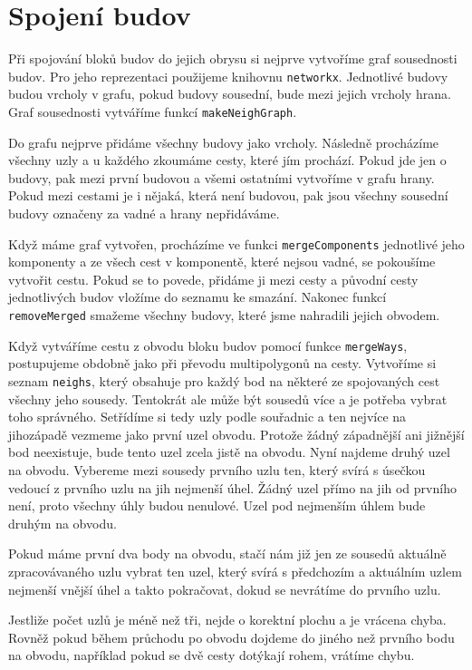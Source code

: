 \section{Spojení budov}
Při spojování bloků budov do jejich obrysu si nejprve vytvoříme graf sousednosti
budov. Pro jeho reprezentaci použijeme knihovnu \verb|networkx|. Jednotlivé
budovy budou vrcholy v grafu, pokud budovy sousední, bude mezi jejich vrcholy
hrana. Graf sousednosti vytváříme funkcí \verb|makeNeighGraph|.

Do grafu nejprve přidáme všechny budovy jako vrcholy. Následně procházíme
všechny uzly a u každého zkoumáme cesty, které jím prochází. Pokud jde jen o
budovy, pak mezi první budovou a všemi ostatními vytvoříme v grafu hrany. Pokud
mezi cestami je i nějaká, která není budovou, pak jsou všechny sousední budovy
označeny za vadné a hrany nepřidáváme.

Když máme graf vytvořen, procházíme ve funkci \verb|mergeComponents| jednotlivé
jeho komponenty a ze všech cest v komponentě, které nejsou vadné, se pokoušíme
vytvořit cestu. Pokud se to povede, přidáme ji mezi cesty a původní cesty
jednotlivých budov vložíme do seznamu ke smazání. Nakonec funkcí
\verb|removeMerged| smažeme všechny budovy, které jsme nahradili jejich obvodem.

Když vytváříme cestu z obvodu bloku budov pomocí funkce \verb|mergeWays|,
postupujeme obdobně jako při převodu multipolygonů na cesty. Vytvoříme si seznam
\verb|neighs|, který obsahuje pro každý bod na některé ze spojovaných cest
všechny jeho sousedy. Tentokrát ale může být sousedů více a je potřeba vybrat
toho správného. Setřídíme si tedy uzly podle souřadnic a ten nejvíce na
jihozápadě vezmeme jako první uzel obvodu.  Protože žádný západnější ani
jižnější bod neexistuje, bude tento uzel zcela jistě na obvodu. Nyní najdeme
druhý uzel na obvodu. Vybereme mezi sousedy prvního uzlu ten, který svírá s
úsečkou vedoucí z prvního uzlu na jih nejmenší úhel. Žádný uzel přímo na jih od
prvního není, proto všechny úhly budou nenulové. Uzel pod nejmenším úhlem bude
druhým na obvodu.

Pokud máme první dva body na obvodu, stačí nám již jen ze sousedů aktuálně
zpracovávaného uzlu vybrat ten uzel, který svírá s předchozím a aktuálním uzlem
nejmenší vnější úhel a takto pokračovat, dokud se nevrátíme do prvního uzlu.

Jestliže počet uzlů je méně než tři, nejde o korektní plochu a je vrácena chyba.
Rovněž pokud během průchodu po obvodu dojdeme do jiného než prvního bodu na
obvodu, například pokud se dvě cesty dotýkají rohem, vrátíme chybu.

